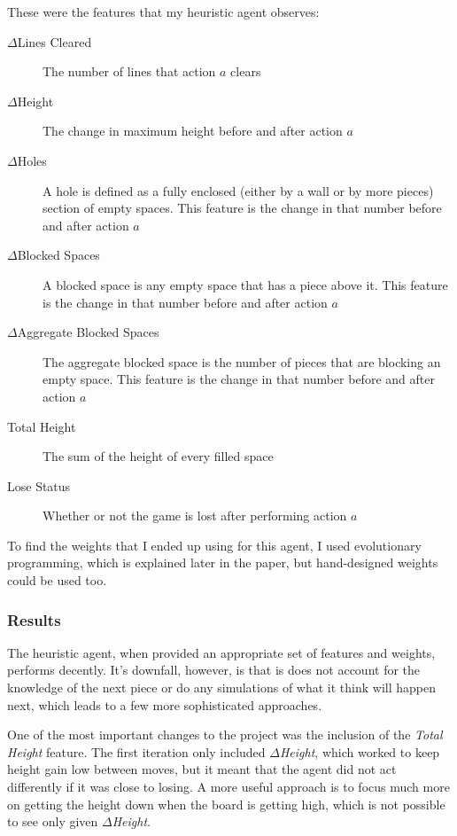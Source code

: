 \documentclass{article}
\begin{document}
These were the features that my heuristic agent observes: 
\begin{description}
  \item[$\Delta$Lines Cleared] The number of lines that action \(a\) clears
  
  \item[$\Delta$Height] The change in maximum height  before and after action \(a\)
  
  \item[$\Delta$Holes] A hole is defined as a fully enclosed (either by a wall or by more pieces) section of empty spaces. This feature is the change in that number before and after action \(a\)
  
  \item[$\Delta$Blocked Spaces] A blocked space is any empty space that has a piece above it. This feature is the change in that number before and after action \(a\)
  
  \item[$\Delta$Aggregate Blocked Spaces] The aggregate blocked space is the number of pieces that are blocking an empty space. This feature is the change in that number before and after action \(a\)
  
  \item[Total Height] The sum of the height of every filled space
  
  \item[Lose Status] Whether or not the game is lost after performing action \(a\)
\end{description}

To find the weights that I ended up using for this agent, I used evolutionary programming, which is explained later in the paper, but hand-designed weights could be used too.

\subsubsection{Results}
The heuristic agent, when provided an appropriate set of features and weights, performs decently. It's downfall, however, is that is does not account for the knowledge of the next piece or do any simulations of what it think will happen next, which leads to a few more sophisticated approaches.

One of the most important changes to the project was the inclusion of the \emph{Total Height} feature. The first iteration only included \emph{$\Delta$Height}, which worked to keep height gain low between moves, but it meant that the agent did not act differently if it was close to losing. A more useful approach is to focus much more on getting the height down when the board is getting high, which is not possible to see only given \emph{$\Delta$Height}.
\end{document}
